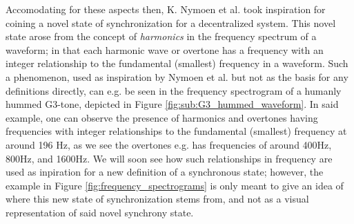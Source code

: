 Accomodating for these aspects then, K. Nymoen et al. took inspiration for coining a novel state of synchronization for a decentralized system. This novel state arose from the concept of \textit{harmonics} in the frequency spectrum of a waveform; in that each harmonic wave or overtone has a frequency with an integer relationship to the fundamental (smallest) frequency in a waveform. Such a phenomenon, used as inspiration by Nymoen et al. but not as the basis for any definitions directly, can e.g. be seen in the frequency spectrogram of a humanly hummed G3-tone, depicted in Figure \ref{fig:sub:G3_hummed_waveform}. In said example, one can observe the presence of harmonics and overtones having frequencies with integer relationships to the fundamental (smallest) frequency at around 196 Hz, as we see the overtones e.g. has frequencies of around 400Hz, 800Hz, and 1600Hz. We will soon see how such relationships in frequency are used as inpiration for a new definition of a synchronous state; however, the example in Figure \ref{fig:frequency_spectrograms} is only meant to give an idea of where this new state of synchronization stems from, and not as a visual representation of said novel synchrony state.

